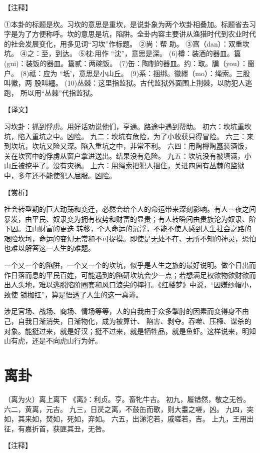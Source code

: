 \documentclass[12pt,UTF8]{ctexbook}
\begin{document}
【注释】

①本卦的标题是坎。习坎的意思是重坎，是说卦象为两个坎卦相叠加。标题省去习字是为了方便称呼。坎的意思是坑，陷阱。全卦内容主要讲从渔猎时代到农业时代的社会发展变化，用多见词“习坎”作标题。
②尚：帮 助。
③窞（dan）：双重坎坑。
④之：至，到达。
⑤枕:用作 “沈”，意思是深。
(6)樽：装酒的器皿。簋(gui)：装饭的器皿。簋贰：两碗饭。
(7)缶：陶制的器皿。约：取。牖（you）：窗户。
(8)祗：应为 “坁’，意思是小山丘。
(9)系：捆绑。徽纆（mo）：绳索。三股叫徽，两 股叫纆。
(10)丛棘：这里指监狱。古代监狱外面围上荆棘，以防犯人逃跑， 所以用“丛棘”代指监狱。

【译文】

习坎卦：抓到俘虏。用好话劝说他们，亨通。路途中遇到帮助。
初六：坎坑重坎坑，陷入重坑之中。凶险。
九二：坎坑有危险，为了小收获只得冒险。
六三：来到坎坑，坎坑又险又深。陷入重坑之中，非常不利。
六四：用陶樽陶簋装酒饭，关在坎窖中的俘虏从窗户拿进送出。结果没有危险。
九五：坎坑没有被填满，小山丘被挖平了。没有灾祸。
上六：用绳索把犯人捆住，关进四周有丛棘的监狱中，多年还不能使犯人屈服。凶险。

【赏析】

社会转型期的巨大动荡和变迁，必然会给个人的命运带来深刻影响。有人一夜之间暴发，由平民、奴隶变为拥有权势和财富的显贵；有人转瞬间由贵族沦为奴隶、阶下囚。江山财富的更迭 转移，个人命运的沉浮，不能不使人感到人生社会之路的艰险坎坷，命运的变幻无常和不可捉摸。即使是无处不在、无所不知的神灵，恐怕也难以解答这一人生的难题。

一个又一个的陷阱，一个又一个的坎坑，似乎是人生之旅的最好说明。做个日出而作日落而息的平民百姓，可能遇到的陷研坎坑会少一点；若想满足权欲物欲财欲而出人头地，难以逃脱陷阶圈套和风口浪尖的摔打。《红楼梦》中说，“因嫌纱帽小，致使 锁枷扛”，算是悟透了人生的这一真谛。

涉足官场、战场、商场、情场等等，人的自我由于众多掣肘的因素而变得身不由己，自我日渐消失，日渐物化，成为被算计、 陷害、剥夺。吞噬、压榨、谋杀的对象。能挺过来，就是好汉；挺不过来，就是牺牲品，就是鱼虾。这样说来，明知山有虎，还是不向虎山行为好。

\chapter{离卦}

（离为火）离上离下
《离》：利贞。亨。畜牝牛吉。
初九，履错然，敬之无咎。
六二，黄离，元吉。
九三，日昃之离，不鼓缶而歌，则大耋之嗟，凶。
九四，突如，其来如，焚如，死如，弃如。
六五，出涕沱若，戚嗟若，吉。
上九，王用出征，有嘉折首，获匪其丑，无咎。

【注释】
\end{document}
